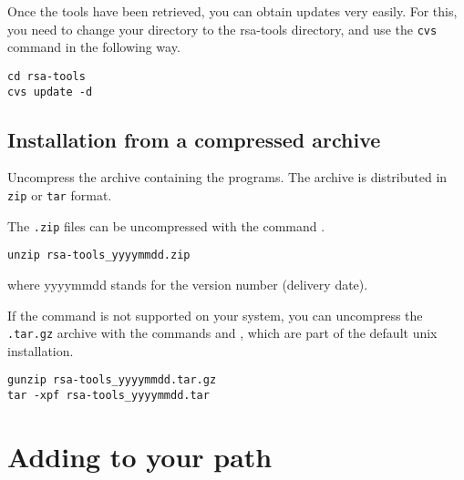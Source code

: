 \documentclass{article}
\begin{document}
Once the tools have been retrieved, you can obtain updates very
easily. For this, you need to change your directory to the rsa-tools
directory, and use the \texttt{cvs} command in the following way.

\begin{verbatim}
cd rsa-tools
cvs update -d
\end{verbatim}


\subsection{Installation from a compressed archive}

Uncompress the archive containing the programs. The archive is
distributed in \texttt{zip} or \texttt{tar} format.

The \texttt{.zip} files can be uncompressed with the command
.

\begin{verbatim}
unzip rsa-tools_yyyymmdd.zip
\end{verbatim}
where yyyymmdd stands for the version number (delivery date).

If the  command is not supported on your system, you
can uncompress the \texttt{.tar.gz} archive with the commands
 and , which are part of the default unix
installation.

\begin{verbatim}
gunzip rsa-tools_yyyymmdd.tar.gz
tar -xpf rsa-tools_yyyymmdd.tar
\end{verbatim}

\section{Adding \RSAT to your path}
\end{document}

